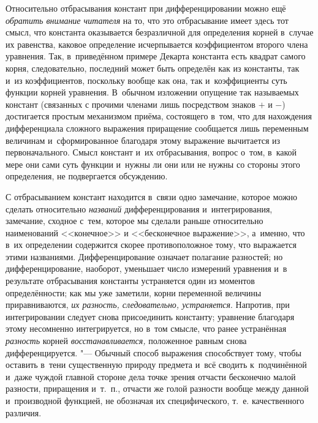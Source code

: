 Относительно отбрасывания констант при дифференцировании можно ещё
{\em обратить внимание читателя} на то, что это отбрасывание имеет здесь тот
смысл, что константа оказывается безразличной для определения корней в~случае
их равенства, каковое определение исчерпывается коэффициентом второго члена
уравнения. Так, в~приведённом примере Декарта константа есть квадрат самого
корня, следовательно, последний может быть определён как из константы, так и~из
коэффициентов, поскольку вообще как она, так и~коэффициенты суть функции корней
уравнения. В~обычном изложении опущение так называемых констант (связанных с
прочими членами лишь посредством знаков $+$ и $-$) достигается простым
механизмом приёма, состоящего в~том, что для нахождения дифференциала сложного
выражения приращение сообщается лишь переменным величинам и~сформированное
благодаря этому выражение вычитается из первоначального. Смысл констант и~их
отбрасывания, вопрос о~том, в~какой мере они сами суть функции и~нужны ли они
или не нужны со стороны этого определения, не подвергается обсуждению.

С отбрасыванием констант находится в~связи одно замечание, которое можно
сделать относительно {\em названий} дифференцирования и~интегрирования,
замечание, сходное с~тем, которое мы сделали раньше относительно наименований
<<конечное>> и <<бесконечное выражение>>, а~именно, что в~их
определении содержится скорее противоположное тому, что выражается этими
названиями. Дифференцирование означает полагание разностей; но
дифференцирование, наоборот, уменьшает число измерений уравнения и~в результате
отбрасывания константы устраняется один из моментов определённости; как мы уже
заметили, корни переменной величины приравниваются,
{\em их разность, следовательно, устраняется}. Напротив, при интегрировании
следует снова присоединить константу; уравнение благодаря этому несомненно
интегрируется, но в~том смысле, что ранее устранённая {\em разность} корней
{\em восстанавливается,} положенное равным снова дифференцируется. "--- Обычный
способ выражения способствует тому, чтобы оставить в~тени существенную природу
предмета и~всё сводить к~подчинённой и~даже чуждой главной стороне дела точке
зрения отчасти бесконечно малой разности, приращения и~т.~п., отчасти же голой
разности вообще между данной и~производной функцией, не обозначая их
специфического, т.~е. качественного различия.

